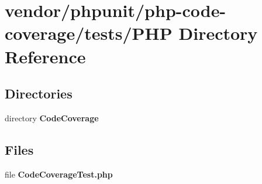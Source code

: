 \section{vendor/phpunit/php-\/code-\/coverage/tests/\+P\+H\+P Directory Reference}
\label{dir_f7405f66af403e1ff61150938f6c22ab}
\subsection*{Directories}
\begin{DoxyCompactItemize}
\item 
directory {\bf Code\+Coverage}
\end{DoxyCompactItemize}
\subsection*{Files}
\begin{DoxyCompactItemize}
\item 
file {\bf Code\+Coverage\+Test.\+php}
\end{DoxyCompactItemize}
